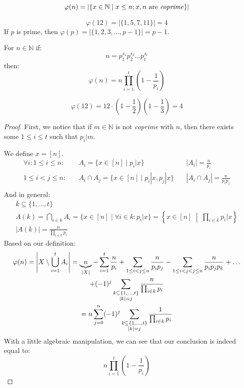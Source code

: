 \documentclass[00_complete]{subfiles}
\begin{document}
\begin{definition}
    $$\varphi(n) = |\{x \in \mathbb{N} \mid x \leq n;
        x,n \text{ are \emph{coprime}}\}|
    $$
\begin{example}
    $$\varphi(12)=|\{1,5,7,11\}|=4$$
    If $p$ is prime, then $\varphi(p)=|\{1,2,3,\dots,p-1\}|=p-1$.
\end{example}
\end{definition}
\begin{theorem}
    For $n \in \mathbb{N}$ if:
    $$n=p_1^{s_1}p_2^{s_2}\dots p_t^{s_t}$$
    then:
    $$\varphi(n)=n\prod_{i=1}^t\left(1-\frac{1}{p_i}\right)$$
    \begin{example}
        $$\varphi(12)=12\cdot\left(1-\frac{1}{2}\right)\left(1-\frac{1}{3}\right)=4$$
    \end{example}
\end{theorem}
\begin{proof}
    First, we notice that if $m \in \mathbb{N}$ is not \emph{coprime} with $n$, then there
    exists some $1\leq i \leq t$ such that $p_i|m$.

    We define $x=[n]$.
    $$
    \begin{aligned}
        \forall i: 1 \leq i \leq n:
        \quad &A_i = \{x \in [n] \mid p_i|x \} \quad&|A_i|=\frac{n}{p_i} \\
        1 \leq i<j\leq n:
        \quad &A_i\cap A_j = \{x \in [n] \mid p_i|x, p_j|x \}  \quad &|A_i \cap A_j| =\frac{n}{p_ip_j} \\
    \end{aligned}
    $$
    And in general:
    $$
    \begin{gathered}
        k \subseteq \{1,\dots,t\} \\
        A(k)=\bigcap_{i \in k}A_i = \{x \in [n] \mid \forall i \in k: p_i|x\}
        = \left\{x \in [n] \;\middle|\; \prod_{i \in k}p_i|x\right\} \\
        |A(k)| = \frac{n}{\prod_{i \in k}p_i}
    \end{gathered}
    $$
    Based on our definition:
    $$
    \begin{gathered}
        \varphi(n) = \left|X \setminus \bigcup_{i=1}^tA_i\right|
        = \underbrace{n}_{|X|}-\sum_{i=1}^{t}\frac{n}{p_i}+\sum_{1\leq i<j\leq
        n}\frac{n}{p_ip_j}-\sum_{1\leq i<j<j\leq n}\frac{n}{p_ip_jp_k}+\dots\\
        +(-1)^j\sum_{\begin{subarray}{c}k \subseteq
        \{1,\dots,t\}\\|k|=j\end{subarray}}\frac{n}{\prod_{i \in k}p_i}\\
        =n\sum_{j=0}^{n}(-1)^j\sum_{\begin{subarray}{c}k \subseteq
        \{1,\dots,t\}\\|k|=j\end{subarray}}\frac{1}{\prod_{i \in k}p_i}
    \end{gathered}
    $$
    With a little algebraic manipulation, we can see that our conclusion is
    indeed equal to:
    $$n\prod_{i=1}^t\left(1-\frac{1}{p_i}\right)$$
\end{proof}
\end{document}
